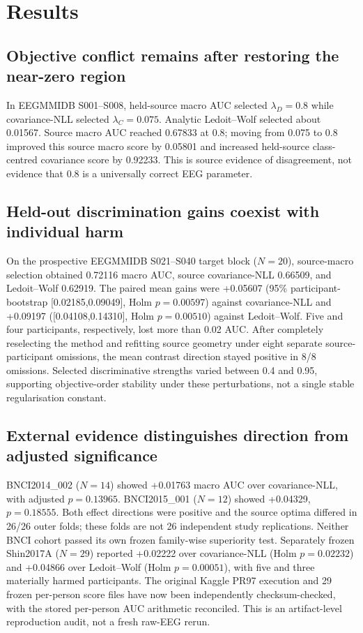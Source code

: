 \documentclass[11pt,a4paper]{article}
\begin{document}
\section{Results}
\subsection{Objective conflict remains after restoring the near-zero region}
In EEGMMIDB S001--S008, held-source macro AUC selected
\(\lambda_D=0.8\) while covariance-NLL selected \(\lambda_C=0.075\).
Analytic Ledoit--Wolf selected about 0.01567. Source macro AUC reached
0.67833 at 0.8; moving from 0.075 to 0.8 improved this source macro
score by 0.05801 and increased held-source class-centred covariance score by 0.92233.
This is source evidence of disagreement, not evidence that 0.8 is a
universally correct EEG parameter.

\subsection{Held-out discrimination gains coexist with individual harm}
On the prospective EEGMMIDB S021--S040 target block (\(N=20\)),
source-macro selection obtained 0.72116 macro AUC, source
covariance-NLL 0.66509, and Ledoit--Wolf 0.62919.
The paired mean gains were +0.05607 (95\% participant-bootstrap
[0.02185,0.09049], Holm \(p=0.00597\)) against covariance-NLL and
+0.09197 ([0.04108,0.14310], Holm \(p=0.00510\)) against
Ledoit--Wolf. Five and four participants, respectively, lost more
than 0.02 AUC. After completely reselecting the method and refitting
source geometry under eight separate source-participant omissions,
the mean contrast direction stayed positive in 8/8 omissions.
Selected discriminative strengths varied between 0.4 and 0.95,
supporting objective-order stability under these perturbations,
not a single stable regularisation constant.

\subsection{External evidence distinguishes direction from adjusted significance}
BNCI2014\_002 (\(N=14\)) showed +0.01763 macro AUC over
covariance-NLL, with adjusted \(p=0.13965\).
BNCI2015\_001 (\(N=12\)) showed +0.04329, \(p=0.18555\).
Both effect directions were positive and the source optima differed in
26/26 outer folds; these folds are not 26 independent study replications.
Neither BNCI cohort passed its own frozen family-wise superiority test.
Separately frozen Shin2017A (\(N=29\)) reported +0.02222 over
covariance-NLL (Holm \(p=0.02232\)) and +0.04866 over Ledoit--Wolf
(Holm \(p=0.00051\)), with five and three materially harmed
participants. The original Kaggle PR97 execution and 29 frozen per-person
score files have now been independently checksum-checked, with
the stored per-person AUC arithmetic reconciled. This is
an artifact-level reproduction audit, not a fresh raw-EEG rerun.
\end{document}
